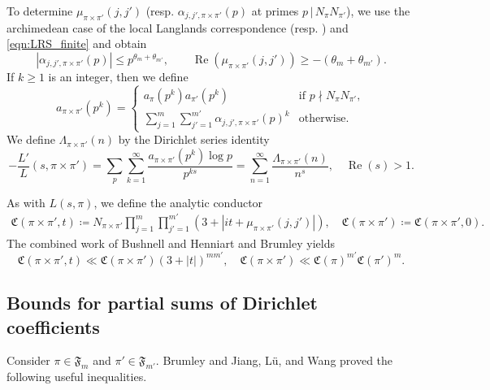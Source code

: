 \documentclass[12pt,reqno]{amsart}
\theoremstyle{remark}
\DeclareMathOperator{\Real}{Re}
\numberwithin{equation}{section}
\begin{document}
   To determine $\mu_{ \pi \times \pi'}(j,j')$ (resp. $\alpha_{j,j', \pi \times \pi'}(p)$ at primes $p\,|\, N_{\pi}N_{\pi'}$), we use the archimedean case of the local Langlands correspondence \cite{MS} (resp. \cite[Appendix]{ST}) and \eqref{eqn:LRS_finite} and obtain
    \begin{equation}
	\label{eqn:LRS_2}	    |\alpha_{j,j',\pi\times\pi'}(p)|\leq p^{\theta_m + \theta_{m'}},\qquad \Real(\mu_{\pi\times\pi'}(j,j'))\geq -(\theta_m + \theta_{m'}).
    \end{equation}
    If $ k \ge 1$ is an integer, then we define 
    \begin{equation}
        a_{\pi \times \pi'}(p^k) = \begin{cases}
            a_\pi(p^k)a_{\pi'}(p^k) & \text{if } p\nmid N_{\pi}N_{\pi'},\\
            \sum_{j=1}^{m} \sum_{j'=1}^{m'} \alpha_{j,j',\pi \times \pi'}(p)^k & \text{otherwise.}
        \end{cases}
    \end{equation}
    We define $\Lambda_{\pi\times\pi'}(n)$ by the Dirichlet series identity
    \begin{equation}
        -\frac{L'}{L}(s,\pi \times \pi') = \sum_{p}\sum_{k=1}^{\infty} \frac{a_{\pi \times \pi'}(p^k)\log p}{p^{ks}} = \sum_{n=1}^{\infty} \frac{\Lambda_{\pi\times\pi'}(n)}{n^{s}}, \quad \Real(s) > 1.
    \end{equation}
    
    
    As with $L(s,\pi)$, we  define the analytic conductor
\begin{equation}\label{eqn:analytic_conductor_def_2}
	\begin{aligned}
        \mathfrak{C}(\pi\times\pi',t) \coloneqq N_{\pi\times\pi'}\prod_{j=1}^m \prod_{j'=1}^{m'}(3+|it+\mu_{\pi\times\pi'}(j,j')|),\quad 
        \mathfrak{C}(\pi\times\pi') \coloneqq \mathfrak{C}(\pi\times\pi',0).
	\end{aligned}
    \end{equation}
    The combined work of Bushnell and Henniart \cite{BushHen} and Brumley \cite[Appendix]{Humphries} yields
    \begin{equation}
	\label{eqn:BH}
        \mathfrak{C}(\pi\times\pi',t)\ll \mathfrak{C}(\pi\times\pi')(3+|t|)^{mm'},\quad \mathfrak{C}(\pi\times\pi')\ll \mathfrak{C}(\pi)^{m'} \mathfrak{C}(\pi')^{m}.
    \end{equation}
    
    \subsection{Bounds for partial sums of Dirichlet coefficients} 
    Consider $\pi \in \mathfrak{F}_m$ and $\pi' \in \mathfrak{F}_{m'}$. Brumley \cite[Appendix]{ST} and Jiang, L\"u, and Wang \cite{JLW} proved the following useful inequalities.
	
\end{document}
